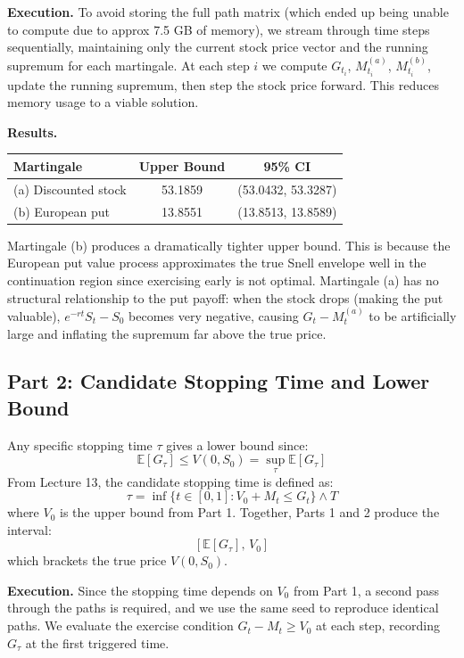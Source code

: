 \documentclass{article}
\begin{document}
\textbf{Execution.} To avoid storing the full path matrix (which ended up being unable to compute due to approx 7.5 GB of memory), we stream through time steps sequentially, maintaining only the current stock price vector and the running supremum for each martingale. At each step $i$ we compute $G_{t_i}$, $M_{t_i}^{(a)}$, $M_{t_i}^{(b)}$, update the running supremum, then step the stock price forward. This reduces memory usage to a viable solution.

\textbf{Results.}

\begin{center}
\begin{tabular}{lcc}
Martingale & Upper Bound & 95\% CI \\
\midrule
(a) Discounted stock & 53.1859 & (53.0432, 53.3287) \\
(b) European put     & 13.8551 & (13.8513, 13.8589) \\
\bottomrule
\end{tabular}
\end{center}

Martingale (b) produces a dramatically tighter upper bound. This is because the European put value process approximates the true Snell envelope well in the continuation region since exercising early is not optimal. Martingale (a) has no structural relationship to the put payoff: when the stock drops (making the put valuable), $e^{-rt}S_t - S_0$ becomes very negative, causing $G_t - M_t^{(a)}$ to be artificially large and inflating the supremum far above the true price.

\subsection*{Part 2: Candidate Stopping Time and Lower Bound}

Any specific stopping time $\tau$ gives a lower bound since:
\[
\mathbb{E}[G_\tau] \leq V(0, S_0) = \sup_\tau \mathbb{E}[G_\tau]
\]
From Lecture 13, the candidate stopping time is defined as:
\[
\tau = \inf\{t \in [0,1] : V_0 + M_t \leq G_t\} \wedge T
\]
where $V_0$ is the upper bound from Part 1. Together, Parts 1 and 2 produce the interval:
\[
\left[\mathbb{E}[G_\tau],\, V_0\right]
\]
which brackets the true price $V(0, S_0)$.

\textbf{Execution.} Since the stopping time depends on $V_0$ from Part 1, a second pass through the paths is required, and we use the same seed to reproduce identical paths. We evaluate the exercise condition $G_t - M_t \geq V_0$ at each step, recording $G_\tau$ at the first triggered time. 
\end{document}
